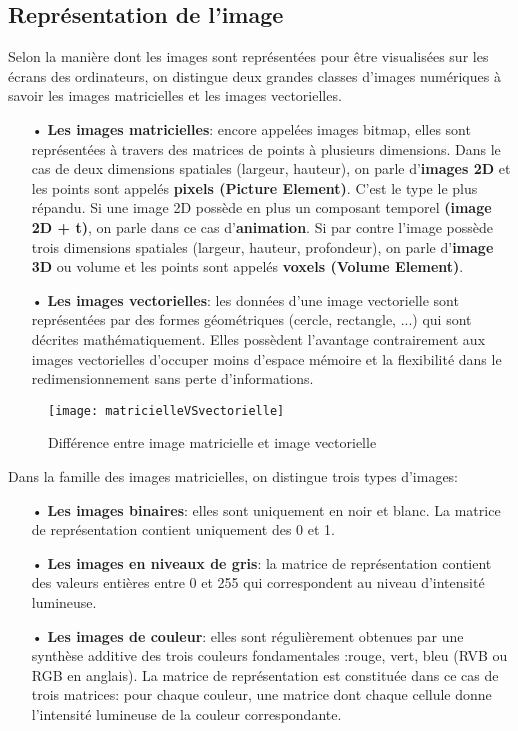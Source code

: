     \subsection{Représentation de l'image}
    Selon la manière dont les images sont représentées pour être visualisées sur les écrans des ordinateurs, on distingue deux grandes classes d’images numériques à savoir les images matricielles et les images vectorielles.
    \begin{itemize}
        \item[•]\textbf{Les images matricielles}: encore appelées images bitmap, elles sont représentées à travers des matrices de points à plusieurs dimensions. Dans le cas de deux dimensions spatiales (largeur, hauteur), on parle d’\textbf{images 2D} et les points sont appelés \textbf{pixels (Picture Element)}. C’est le type le plus répandu. Si une image 2D possède en plus un composant temporel \textbf{(image 2D + t)}, on parle dans ce cas d’\textbf{animation}. Si par contre l’image possède trois dimensions spatiales (largeur, hauteur, profondeur), on parle d’\textbf{image 3D} ou volume et les points sont appelés \textbf{voxels (Volume Element)}.
        \item[•]\textbf{Les images vectorielles}: les données d'une image vectorielle sont représentées par des formes géométriques (cercle, rectangle, ...) qui sont décrites mathématiquement. Elles possèdent l’avantage contrairement aux images vectorielles d’occuper moins d’espace mémoire et la flexibilité dans le redimensionnement sans perte d’informations.
    \end{itemize}
    \begin{figure}[H]
        \centering
        \texttt{[image: matricielleVSvectorielle]}
        \caption{Différence entre image matricielle et image vectorielle}
    \end{figure}
    Dans la famille des images matricielles, on distingue trois types d’images:
    \begin{itemize}
        \item[•]\textbf{Les images binaires}: elles sont uniquement en noir et blanc. La matrice de représentation contient uniquement des 0 et 1.
        \item[•]\textbf{Les images en niveaux de gris}: la matrice de représentation contient des valeurs entières entre 0 et 255 qui correspondent au niveau d’intensité lumineuse.
        \item[•]\textbf{Les images de couleur}: elles sont régulièrement obtenues par une synthèse additive des trois couleurs fondamentales :rouge, vert, bleu (RVB ou RGB en anglais). La matrice de représentation est constituée dans ce cas de trois matrices: pour chaque couleur, une matrice dont chaque cellule donne l’intensité lumineuse de la couleur correspondante.
    \end{itemize}
